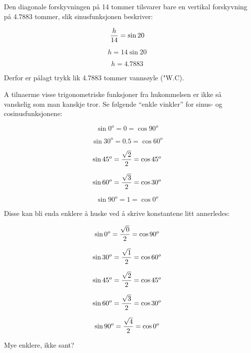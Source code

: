 \vskip 10pt

Den diagonale forskyvningen på 14 tommer tilsvarer bare en vertikal forskyvning på 4.7883 tommer, slik sinusfunksjonen beskriver:

$${h \over 14} = \sin 20$$

$$h = 14 \sin 20$$

$$h = 4.7883$$

Derfor er pålagt trykk lik 4.7883 tommer vannsøyle ("W.C).

\vskip 10pt

A tilnaerme visse trigonometriske funksjoner fra hukommelsen er ikke så vanskelig som man kanskje tror.  Se følgende ``enkle vinkler'' for sinus- og cosinusfunksjonene:

$$\sin 0^o = 0 = \cos 90^o$$

$$\sin 30^o = 0.5 = \cos 60^o$$

$$\sin 45^o = {\sqrt{2} \over 2} = \cos 45^o$$

$$\sin 60^o = {\sqrt{3} \over 2} = \cos 30^o$$

$$\sin 90^o = 1 = \cos 0^o$$

Disse kan bli enda enklere å huske ved å skrive konstantene litt annerledes:

$$\sin 0^o = {\sqrt{0} \over 2} = \cos 90^o$$

$$\sin 30^o = {\sqrt{1} \over 2} = \cos 60^o$$

$$\sin 45^o = {\sqrt{2} \over 2} = \cos 45^o$$

$$\sin 60^o = {\sqrt{3} \over 2} = \cos 30^o$$

$$\sin 90^o = {\sqrt{4} \over 2} = \cos 0^o$$

Mye enklere, ikke sant?



